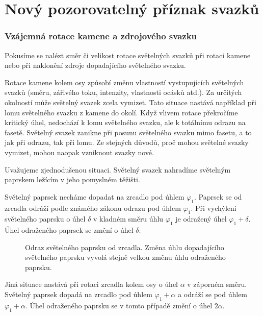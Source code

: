\part{Nový pozorovatelný příznak svazků}



\section{Vzájemná rotace kamene a zdrojového svazku}
Pokusíme se nalézt směr či velikost rotace světelných svazků při rotaci kamene nebo při naklonění zdroje dopadajícího světelného svazku. 

Rotace kamene kolem osy způsobí změnu vlastností vystupujících světelných svazků (směru, zářivého toku, intenzity, vlastnosti ocásků atd.). Za určitých okolností může světelný svazek zcela vymizet. Tato situace nastává například při lomu světelného svazku z kamene do okolí. Když vlivem rotace překročíme kritický úhel, nedochází k lomu světelného svazku, ale k totálnímu odrazu na fasetě. Světelný svazek zanikne při posunu světelného svazku mimo fasetu, a to jak při odrazu, tak při lomu. Ze stejných důvodů, proč mohou světelné svazky vymizet, mohou naopak vzniknout svazky nové.

Uvažujeme zjednodušenou situaci. Světelný svazek nahradíme světelným paprskem ležícím v jeho pomyslném těžišti. 

Světelný paprsek necháme dopadat na zrcadlo pod úhlem $\varphi_1$. Paprsek se od zrcadla odráží podle známého zákonu odrazu pod úhlem $\varphi_1$. Při vychýlení světelného paprsku o úhel $ \delta $ v kladném směru úhlu $\varphi_1$ je odražený úhel $\varphi_1 + \delta$. Úhel odraženého paprsek se změní o úhel $ \delta $.

\begin{figure}[h!]
\begin{center}
\scalebox{1}{ }
\end{center}
\caption[Odraz světelného paprsku od zrcadla.]{Odraz světelného paprsku od zrcadla. Změna úhlu dopadajícího světelného paprsku vyvolá stejně velkou změnu úhlu odraženého paprsku.}
\label{fig:odraz laser}
\end{figure}

Jiná situace nastává při rotaci zrcadla kolem osy o úhel $\alpha$ v záporném směru. Světelný paprsek dopadá na zrcadlo pod úhlem $\varphi_1 + \alpha$ a  odráží se pod úhlem $\varphi_1+\alpha$. Úhel odraženého paprsku se v tomto případě změní o úhel $2\alpha$. 

